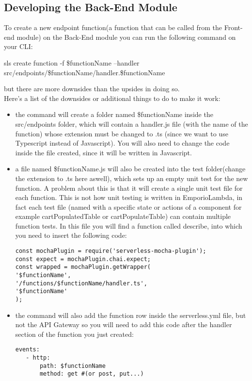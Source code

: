 \subsection{Developing the Back-End Module}
To create a new endpoint function(a function that can be called from the Front-end module) on the Back-End module you can run the following command on your CLI: 
\begin{center}
sls create function -f \$functionName --handler src/endpoints/\$functionName/handler.\$functionName
\end{center}
but there are more downsides than the upsides in doing so.\\
Here's a list of the downsides or additional things to do to make it work:
\begin{itemize}
\item the command will create a folder named \$functionName inside the src/endpoints folder, which will contain a handler.js file (with the name of the function) whose extension must be changed to .ts (since we want to use Typescript instead of Javascript). You will also need to change the code inside the file created, since it will be written in Javascript.
\item a file named \$functionName.js will also be created into the test folder(change the extension to .ts here aswell), which sets up an empty unit test for the new function. A problem about this is that it will create a single unit test file for each function. This is not how unit testing is written in EmporioLambda, in fact each test file (named with a specific state or actions of a component for example cartPopulatedTable or cartPopulateTable) can contain multiple function tests.
In this file you will find a function called describe, into which you need to insert the following code:
\begin{lstlisting}
const mochaPlugin = require('serverless-mocha-plugin');
const expect = mochaPlugin.chai.expect;
const wrapped = mochaPlugin.getWrapper(
'$functionName', 
'/functions/$functionName/handler.ts',
'$functionName'
);
\end{lstlisting}
\item the command will also add the function row inside the serverless.yml file, but not the API Gateway so you will need to add this code after the handler section of the function you just created:
\begin{lstlisting}
events:
   - http:
       path: $functionName
       method: get #(or post, put...)
\end{lstlisting}
\end{itemize}
